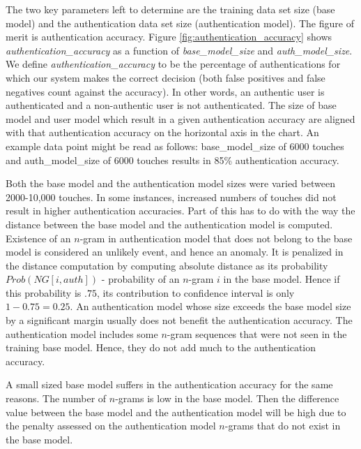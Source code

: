 \documentclass{acm_proc_article-sp}
\begin{document}
%
The two key parameters left to determine are the training data set size (base model) and the 
authentication data set size (authentication model). The figure of merit is authentication accuracy.
Figure \ref{fig:authentication_accuracy} shows {\it authentication\_accuracy} as a function of {\it base\_model\_size} 
and {\it auth\_model\_size}. We define {\it authentication\_accuracy} to be the percentage of authentications for which our system makes the correct decision (both false positives and
false negatives count against the accuracy).
In other words, an authentic user is authenticated and a non-authentic user is not authenticated.
The size of base model and user model which result in a given authentication accuracy are aligned with that authentication accuracy on the horizontal axis in the chart.
An example data point
might be read as follows: base\_model\_size of
6000 touches and auth\_model\_size of 6000 touches
results in 85\% authentication accuracy.

Both the base model and the authentication model sizes were varied between 2000-10,000 touches.
In some instances, increased numbers of touches did not result in higher authentication accuracies. 
Part of this has to do with the way the distance between the base model and the authentication
model is computed. Existence of an $n$-gram in authentication model that does not belong to the base model
is considered an unlikely event, and hence an anomaly. It is penalized in the distance computation
by computing absolute distance as its probability $Prob(NG[i, auth])$ - probability of an $n$-gram
$i$ in the base model. Hence if this probability is $.75$, its contribution to
confidence interval is only $1-0.75=0.25$.
An authentication model whose size exceeds the base model size by a significant margin usually
does not benefit the authentication accuracy. The authentication model includes some
$n$-gram sequences that were not seen in the training base model. Hence, they do not add much to the
authentication accuracy.

A small sized base model suffers in the authentication accuracy for the same reasons. 
The number of $n$-grams is low in the base model.  Then the difference value between the base
model and the authentication model will be high due to the penalty assessed on the authentication model
$n$-grams that do not exist in the base model. 
\end{document}
